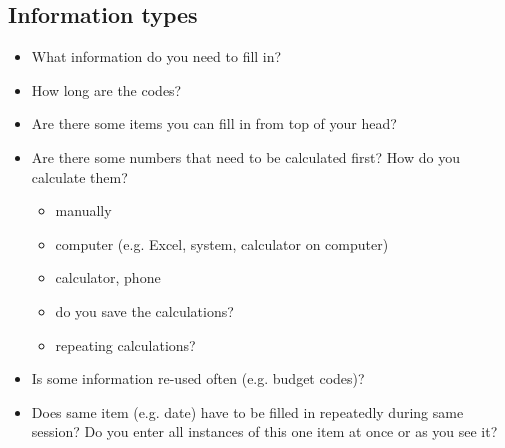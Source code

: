 \subsection{Information types}
\begin{itemize}
\item What information do you need to fill in?
\item How long are the codes?
\item Are there some items you can fill in from top of your head?
\item Are there some numbers that need to be calculated first? How do you calculate them?
\begin{itemize}
\item manually
\item computer (e.g. Excel, system, calculator on computer)
\item calculator, phone
\item do you save the calculations?
\item repeating calculations?
	\end{itemize}
\item Is some information re-used often (e.g. budget codes)?
\item Does same item (e.g. date) have to be filled in repeatedly during same session? Do you enter all instances of this one item at once or as you see it?
\end{itemize}

